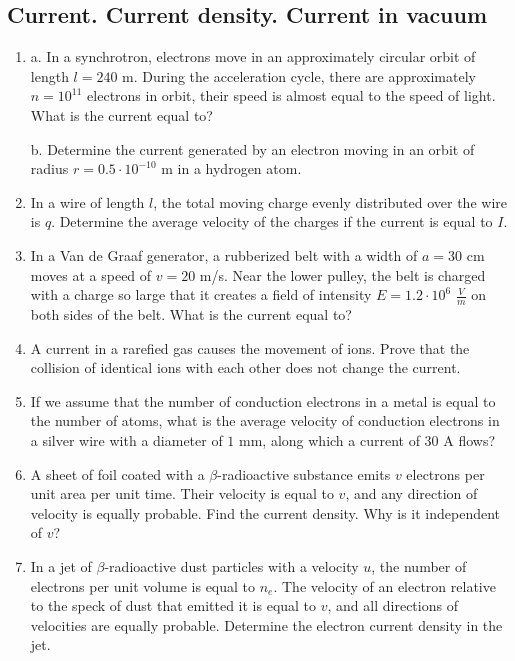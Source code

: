 \documentclass{article}
\begin{document}
\subsection{Current. Current density. Current in vacuum}
\begin{enumerate}[label=8.1.\arabic*]



\item a. In a synchrotron, electrons move in an approximately circular orbit of length $l = 240$ m. During the acceleration cycle, there are approximately $n = 10^{11}$ electrons in orbit, their speed is almost equal to the speed of light. What is the current equal to? 

b. Determine the current generated by an electron moving in an orbit of radius $r = 0.5 \cdot 10^{-10}$ m in a hydrogen atom.

\item In a wire of length $l$, the total moving charge evenly distributed over the wire is $q$. Determine the average velocity of the charges if the current is equal to $I$.

\item In a Van de Graaf generator, a rubberized belt with a width of $a = 30$ cm moves at a speed of $v = 20$ m/s. Near the lower pulley, the belt is charged with a charge so large that it creates a field of intensity $E = 1.2 \cdot 10^6$ $\frac{V}{m}$ on both sides of the belt. What is the current equal to?

\item A current in a rarefied gas causes the movement of ions. Prove that the collision of identical ions with each other does not change the current.

\item If we assume that the number of conduction electrons in a metal is equal to the number of atoms, what is the average velocity of conduction electrons in a silver wire with a diameter of $1$ mm, along which a current of $30$ A flows?

\item A sheet of foil coated with a $\beta$-radioactive substance emits $v$ electrons per unit area per unit time. Their velocity is equal to $v$, and any direction of velocity is equally probable. Find the current density. Why is it independent of $v$?

\item In a jet of $\beta$-radioactive dust particles with a velocity $u$, the number of electrons per unit volume is equal to $n_e$. The velocity of an electron relative to the speck of dust that emitted it is equal to $v$, and all directions of velocities are equally probable. Determine the electron current density in the jet.


\end{enumerate}
\end{document}
